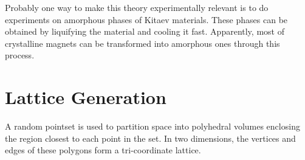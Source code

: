 \documentclass[%
 reprint,
superscriptaddress,
 amsmath,amssymb,
aps,
]{revtex4-2}
\begin{document}
{\color{red} Probably one way to make this theory experimentally relevant is to do experiments on amorphous phases of Kitaev materials. These phases can be obtained by liquifying the material and cooling it fast. Apparently, most of crystalline magnets can be transformed into amorphous ones through this process.
}





\appendix

\section{Lattice Generation} \label{apx:lattice_construction}

A random pointset is used to partition space into polyhedral volumes enclosing the region closest to each point in the set. In two dimensions, the vertices and edges of these polygons form a tri-coordinate lattice.






\end{document}
